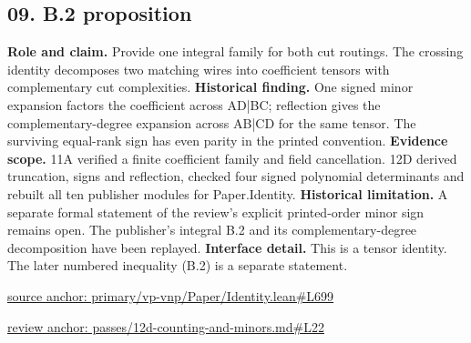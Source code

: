 \documentclass[11pt,letterpaper]{article}
\theoremstyle{definition}\newtheorem{definition}[theorem]{Definition}\newtheorem{example}[theorem]{Example}
\theoremstyle{remark}\newtheorem{remark}[theorem]{Remark}
\begin{document}
\subsection*{09. B.2 proposition}
\textbf{Role and claim.} Provide one integral family for both cut routings. The crossing identity decomposes two matching wires into coefficient tensors with complementary cut complexities.
\textbf{Historical finding.} One signed minor expansion factors the coefficient across AD|BC; reflection gives the complementary-degree expansion across AB|CD for the same tensor. The surviving equal-rank sign has even parity in the printed convention.
\textbf{Evidence scope.} 11A verified a finite coefficient family and field cancellation. 12D derived truncation, signs and reflection, checked four signed polynomial determinants and rebuilt all ten publisher modules for Paper.Identity.
\textbf{Historical limitation.} A separate formal statement of the review's explicit printed-order minor sign remains open. The publisher's integral B.2 and its complementary-degree decomposition have been replayed.
\textbf{Interface detail.} This is a tensor identity. The later numbered inequality (B.2) is a separate statement.
\par\href{https://github.com/nousentllc/VP-VNP-Review/blob/8a7976933b6b2b4ffda1ad3a0dfb5fc6b6f023e8/primary/vp-vnp/Paper/Identity.lean\#L699}{source anchor: primary/vp-vnp/Paper/Identity.lean\#L699}
\par\href{https://github.com/nousentllc/VP-VNP-Review/blob/8a7976933b6b2b4ffda1ad3a0dfb5fc6b6f023e8/passes/12d-counting-and-minors.md\#L22}{review anchor: passes/12d-counting-and-minors.md\#L22}
\goodbreak
{}
\hypertarget{claim.10}{}
\end{document}

